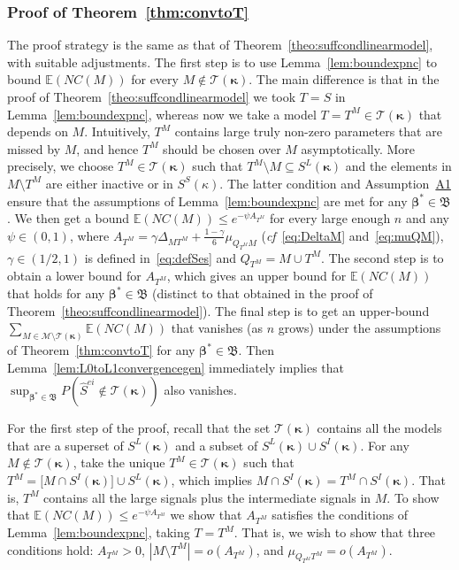 \documentclass[
  12pt]{article}
\newcommand{\E}{\mathbb{E}}
\newcommand{\M}{\mathcal{M}}
\newcommand{\T}{\mathcal{T}}
\newcommand{\bbeta}{\boldsymbol{\beta}}
\newcommand{\bB}{\mathfrak{B}}
\newcommand{\bkappa}{\boldsymbol{\kappa}}
\begin{document}
\subsubsection{Proof of Theorem~\ref{thm:convtoT}}
The proof strategy is the same as that of Theorem~\ref{theo:suffcondlinearmodel}, with suitable adjustments. 
The first step is to use Lemma~\ref{lem:boundexpnc} to bound $\E(NC(M))$ for every $M\not\in \T(\bkappa)$. The main difference is that
in the proof of Theorem~\ref{theo:suffcondlinearmodel} 
we took $T=S$ in Lemma~\ref{lem:boundexpnc}, whereas now we take  a model $T=T^M\in \T(\bkappa)$
that depends on $M$. 
Intuitively, $T^M$ contains large truly non-zero parameters that are missed by $M$, and hence $T^M$ should be chosen over $M$ asymptotically. More precisely,
we choose $T^M\in \T(\bkappa)$ such that 
$T^M\setminus M\subseteq S^L(\bkappa)$ and the elements in $M\setminus T^M$ are either inactive or in $S^S(\kappa)$. The latter condition 
and Assumption~\hyperlink{lab:A1}{A1} ensure that the assumptions of Lemma~\ref{lem:boundexpnc} are met for any $\bbeta^*\in \bB$. We then get a bound $\E(NC(M)) \leq e^{-\psi A_{T^M}}$ for every large enough $n$ and any $\psi \in (0,1)$, where $A_{T^M}=\gamma\Delta_{MT^M}+\tfrac{1-\gamma}{6}\mu_{Q_{T^M}M}$ (\emph{cf}~\eqref{eq:DeltaM} and~\eqref{eq:muQM}), $\gamma\in(1/2,1)$ is defined in~\eqref{eq:defSes} and $Q_{T^M}= M\cup T^M$. The second step is to obtain a lower bound for $A_{T^M}$, which gives an upper bound for $\E(NC(M))$ that holds for any $\bbeta^*\in \bB$ (distinct to that obtained in the proof of Theorem~\ref{theo:suffcondlinearmodel}).
The final step is to 
get an upper-bound $\sum_{M \in \M\setminus \T(\bkappa)} \E\left(NC(M)\right)$ that vanishes (as $n$ grows) under the assumptions of Theorem~\ref{thm:convtoT} for any $\bbeta^*\in \bB$. Then Lemma~\ref{lem:L0toL1convergencegen} immediately implies that $\sup_{\bbeta^*\in \bB}P(\hat{S}^{ei}\not \in \T(\bkappa))$ also vanishes.

For the first step of the proof, recall that the set $\T(\bkappa)$ contains all the models that are a superset of $S^L(\bkappa)$ and a subset of $S^L(\bkappa)\cup S^{I}(\bkappa)$. For any $M \not\in\T(\bkappa)$, take the unique $T^M\in\T(\bkappa)$ such that $T^M = \big[M\cap S^{I}(\bkappa)\big]\cup S^L(\bkappa) $, which implies $M\cap S^{I}(\bkappa)=T^M\cap S^{I}(\bkappa)$. 
That is, $T^M$ contains all the large signals plus the intermediate signals in $M$.
To show that $\E(NC(M)) \leq e^{-\psi A_{T^M}}$ we show that $A_{T^M}$ satisfies the conditions of Lemma~\ref{lem:boundexpnc}, taking $T=T^M$. That is, we wish to show that three conditions hold: $A_{T^M}>0$, $|M\setminus T^M|=o(A_{T^M})$, and $\mu_{Q_{T^M} T^M}=o(A_{T^M})$.
\end{document}
